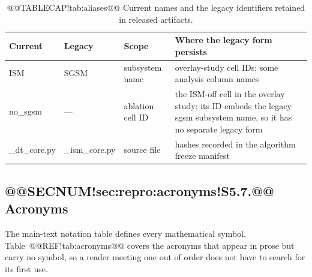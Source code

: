 \documentclass[10pt,a4paper]{article}
\begin{document}
\begin{table}[H]
\caption{@@TABLECAP!tab:aliases@@ Current names and the legacy identifiers retained in released
artifacts.}
\label{tab:aliases}
\small
\begin{tabular}{lllp{4.4cm}}
\toprule
\textbf{Current} & \textbf{Legacy} & \textbf{Scope} & \textbf{Where the legacy form persists}\\
\midrule
ISM & SGSM & subsystem name & overlay-study cell IDs; some analysis column names\\
no\_sgsm & --- & ablation cell ID & the ISM-off cell in the overlay
study; its ID embeds the legacy sgsm subsystem name, so it has no
separate legacy form\\
\_dt\_core.py & \_ism\_core.py & source file & hashes recorded in the
algorithm freeze manifest\\
\bottomrule
\end{tabular}
\end{table}

\subsection{@@SECNUM!sec:repro:acronyms!S5.7.@@ Acronyms}\label{sec:repro:acronyms}

The main-text notation table defines every mathematical symbol.
Table~@@REF!tab:acronyms@@ covers the acronyms that appear in prose but carry no
symbol, so a reader meeting one out of order does not have to search for its
first use.
\end{document}
